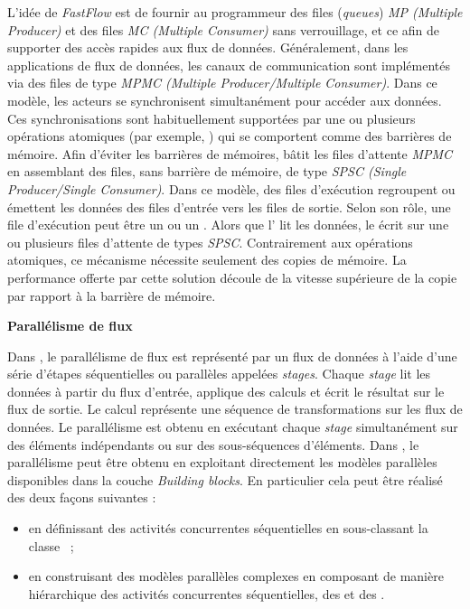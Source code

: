 L'id\'ee de \emph{FastFlow} est de fournir au programmeur des files (\emph{queues}) \emph{MP (Multiple Producer)} et des files \emph{MC (Multiple Consumer)} sans verrouillage, et ce afin de supporter des acc\`es rapides aux flux de donn\'ees. G\'en\'eralement, dans les applications de flux de donn\'ees, les canaux de communication sont impl\'ementés via des files de type \emph{MPMC (Multiple Producer/Multiple Consumer)}. Dans ce modèle, les acteurs se synchronisent simultanément pour acc\'eder aux donn\'ees. Ces synchronisations sont habituellement support\'ees par une ou plusieurs op\'erations atomiques (par exemple, ) qui se comportent comme des barri\`eres de m\'emoire. Afin d'\'eviter les barri\`eres de m\'emoires,  b\^atit les files d'attente \emph{MPMC} en assemblant des files, sans barri\`ere de m\'emoire, de type \emph{SPSC (Single Producer/Single Consumer)}. Dans ce mod\`ele, des files d’ex\'ecution regroupent ou \'emettent les donn\'ees des files d'entr\'ee vers les files de sortie. Selon son r\^ole, une file d'ex\'ecution peut \^etre un  ou un . Alors que l' lit les donn\'ees, le  \'ecrit sur une ou plusieurs files d'attente de types \emph{SPSC}. Contrairement aux op\'erations atomiques, ce m\'ecanisme n\'ecessite seulement des copies de m\'emoire. La performance offerte par cette solution d\'ecoule de la vitesse sup\'erieure de la copie par rapport \`a la barri\`ere de m\'emoire.


\textbf{Parall\'elisme de flux}

Dans , le parall\'elisme de flux est repr\'esent\'e par un flux de donn\'ees \`a l'aide d'une s\'erie d'\'etapes s\'equentielles ou parall\`eles appel\'ees \emph{stages}. Chaque \emph{stage} lit les donn\'ees \`a partir du flux d'entr\'ee, applique des calculs et \'ecrit le r\'esultat sur le flux de sortie. Le calcul repr\'esente une s\'equence de transformations sur les flux de donn\'ees. Le parall\'elisme est obtenu en ex\'ecutant chaque \emph{stage} simultan\'ement sur des \'el\'ements ind\'ependants ou sur des sous-s\'equences d'\'el\'ements. Dans , le parall\'elisme peut \^etre obtenu en exploitant directement les mod\`eles parall\`eles disponibles dans la couche \emph{Building blocks}. En particulier cela peut \^etre r\'ealis\'e des deux fa\c{c}ons suivantes :

\begin{itemize}
\item en d\'efinissant des activit\'es concurrentes s\'equentielles en sous-classant la classe ~;
 
\item en construisant des mod\`eles parall\`eles complexes en composant de mani\`ere hi\'erarchique des activit\'es concurrentes s\'equentielles, des  et des .
\end{itemize}

